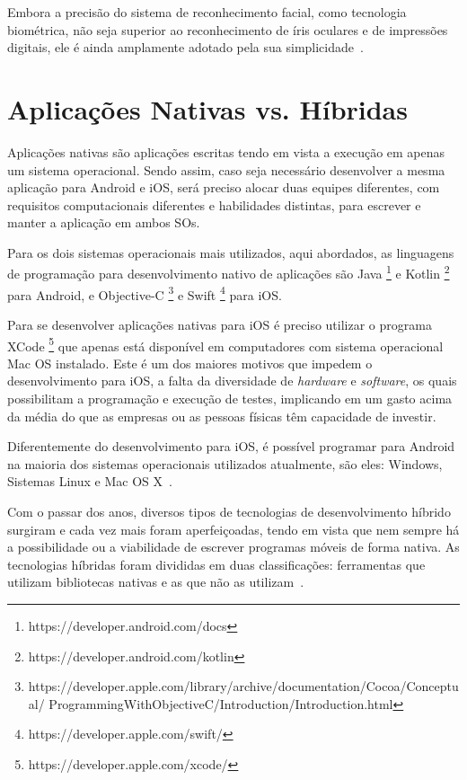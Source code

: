 Embora a precisão do sistema de reconhecimento facial, como tecnologia biométrica, não seja superior ao reconhecimento de íris oculares e de impressões digitais, ele é ainda amplamente adotado pela sua simplicidade~\cite{orvalho2019reconhecimento}.


\section{Aplicações Nativas vs. Híbridas}\label{sec:aplicacoes-nativas-vs.-hibridas}
Aplicações nativas são aplicações escritas tendo em vista a execução em apenas um sistema operacional\cite{clow2019flutter}.
Sendo assim, caso seja necessário desenvolver a mesma aplicação para Android e iOS, será preciso alocar duas equipes diferentes, com requisitos computacionais diferentes e habilidades distintas, para escrever e manter a aplicação em ambos SOs.

Para os dois sistemas operacionais mais utilizados, aqui abordados, as linguagens de programação para desenvolvimento nativo de aplicações são Java \footnote{https://developer.android.com/docs} e Kotlin \footnote{https://developer.android.com/kotlin} para Android, e Objective-C \footnote{https://developer.apple.com/library/archive/documentation/Cocoa/Conceptual/ \newline ProgrammingWithObjectiveC/Introduction/Introduction.html} e Swift \footnote{https://developer.apple.com/swift/} para iOS\@.


Para se desenvolver aplicações nativas para iOS é preciso utilizar o programa XCode \footnote{https://developer.apple.com/xcode/} que apenas está disponível em computadores com sistema operacional Mac OS instalado\cite{goadrich2011smart}.
Este é um dos maiores motivos que impedem o desenvolvimento para iOS, a falta da diversidade de \textit{hardware} e \textit{software}, os quais possibilitam a programação e execução de testes, implicando em um gasto acima da média do que as empresas ou as pessoas físicas têm capacidade de investir.

Diferentemente do desenvolvimento para iOS, é possível programar para Android na maioria dos sistemas operacionais utilizados atualmente, são eles: Windows, Sistemas Linux e Mac OS X~\cite{goadrich2011smart}.


Com o passar dos anos, diversos tipos de tecnologias de desenvolvimento híbrido surgiram e cada vez mais foram aperfeiçoadas, tendo em vista que nem sempre há a possibilidade ou a viabilidade de escrever programas móveis de forma nativa.
As tecnologias híbridas foram divididas em duas classificações: ferramentas que utilizam bibliotecas nativas e as que não as utilizam~\cite{clow2019flutter}.

